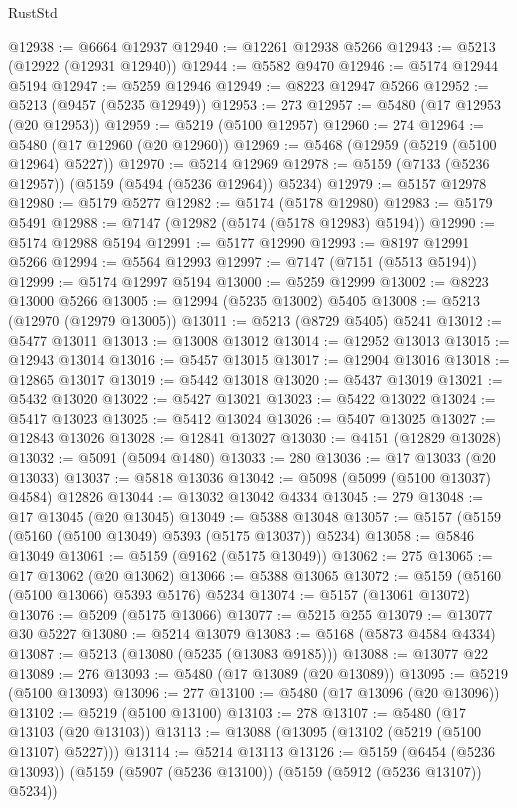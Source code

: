 \begin{lexlean}{RustStd}
\begin{coremodule}
@12938 := @6664 @12937
@12940 := @12261 @12938 @5266
@12943 := @5213 (@12922 (@12931 @12940))
@12944 := @5582 @9470
@12946 := @5174 @12944 @5194
@12947 := @5259 @12946
@12949 := @8223 @12947 @5266
@12952 := @5213 (@9457 (@5235 @12949))
@12953 := 273
@12957 := @5480 (@17 @12953 (@20 @12953))
@12959 := @5219 (@5100 @12957)
@12960 := 274
@12964 := @5480 (@17 @12960 (@20 @12960))
@12969 := @5468 (@12959 (@5219 (@5100 @12964) @5227))
@12970 := @5214 @12969
@12978 := @5159 (@7133 (@5236 @12957)) (@5159 (@5494 (@5236 @12964)) @5234)
@12979 := @5157 @12978
@12980 := @5179 @5277
@12982 := @5174 (@5178 @12980)
@12983 := @5179 @5491
@12988 := @7147 (@12982 (@5174 (@5178 @12983) @5194))
@12990 := @5174 @12988 @5194
@12991 := @5177 @12990
@12993 := @8197 @12991 @5266
@12994 := @5564 @12993
@12997 := @7147 (@7151 (@5513 @5194))
@12999 := @5174 @12997 @5194
@13000 := @5259 @12999
@13002 := @8223 @13000 @5266
@13005 := @12994 (@5235 @13002) @5405
@13008 := @5213 (@12970 (@12979 @13005))
@13011 := @5213 (@8729 @5405) @5241
@13012 := @5477 @13011
@13013 := @13008 @13012
@13014 := @12952 @13013
@13015 := @12943 @13014
@13016 := @5457 @13015
@13017 := @12904 @13016
@13018 := @12865 @13017
@13019 := @5442 @13018
@13020 := @5437 @13019
@13021 := @5432 @13020
@13022 := @5427 @13021
@13023 := @5422 @13022
@13024 := @5417 @13023
@13025 := @5412 @13024
@13026 := @5407 @13025
@13027 := @12843 @13026
@13028 := @12841 @13027
@13030 := @4151 (@12829 @13028)
@13032 := @5091 (@5094 @1480)
@13033 := 280
@13036 := @17 @13033 (@20 @13033)
@13037 := @5818 @13036
@13042 := @5098 (@5099 (@5100 @13037) @4584) @12826
@13044 := @13032 @13042 @4334
@13045 := 279
@13048 := @17 @13045 (@20 @13045)
@13049 := @5388 @13048
@13057 := @5157 (@5159 (@5160 (@5100 @13049) @5393 (@5175 @13037)) @5234)
@13058 := @5846 @13049
@13061 := @5159 (@9162 (@5175 @13049))
@13062 := 275
@13065 := @17 @13062 (@20 @13062)
@13066 := @5388 @13065
@13072 := @5159 (@5160 (@5100 @13066) @5393 @5176) @5234
@13074 := @5157 (@13061 @13072)
@13076 := @5209 (@5175 @13066)
@13077 := @5215 @255
@13079 := @13077 @30 @5227
@13080 := @5214 @13079
@13083 := @5168 (@5873 @4584 @4334)
@13087 := @5213 (@13080 (@5235 (@13083 @9185)))
@13088 := @13077 @22
@13089 := 276
@13093 := @5480 (@17 @13089 (@20 @13089))
@13095 := @5219 (@5100 @13093)
@13096 := 277
@13100 := @5480 (@17 @13096 (@20 @13096))
@13102 := @5219 (@5100 @13100)
@13103 := 278
@13107 := @5480 (@17 @13103 (@20 @13103))
@13113 := @13088 (@13095 (@13102 (@5219 (@5100 @13107) @5227)))
@13114 := @5214 @13113
@13126 := @5159
    (@6454 (@5236 @13093))
    (@5159 (@5907 (@5236 @13100)) (@5159 (@5912 (@5236 @13107)) @5234))

\end{coremodule}
\end{lexlean}
